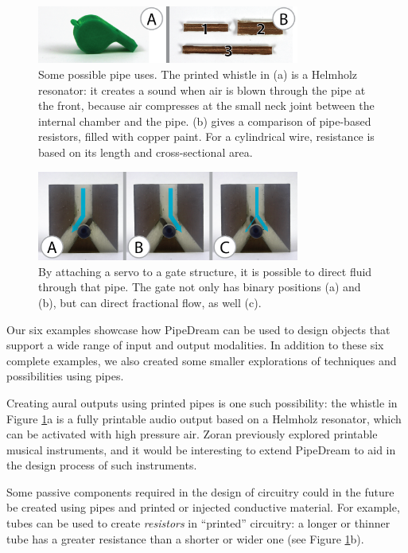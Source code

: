 \begin{figure}
\centering
    \includegraphics[width=3.4in]{figures/speculative.png}
\caption{Some possible pipe uses.  The printed whistle in (a) is a Helmholz resonator: it creates a sound when air is blown through the pipe at the front, because air compresses at the small neck joint between the internal chamber and the pipe.  (b) gives a comparison of pipe-based resistors, filled with copper paint.  For a cylindrical wire, resistance is based on its length and cross-sectional area.}
\label{fig:speculative}
\end{figure}

\begin{figure}
\centering
    \includegraphics[width=3.4in]{figures/gates.png}
\caption{By attaching a servo to a gate structure, it is possible to direct fluid through that pipe.  The gate not only has binary positions (a) and (b), but can direct fractional flow, as well (c).}
\label{fig:direct}
\end{figure}

Our six examples showcase how PipeDream can be used to design objects that support a wide range of input and output modalities.  In addition to these six complete examples, we also created some smaller explorations of techniques and possibilities using pipes.

Creating aural outputs using printed pipes is one such possibility: the whistle in Figure \ref{fig:speculative}a is a fully printable audio output based on a Helmholz resonator, which can be activated with high pressure air.  Zoran \cite{Zoran-flute} previously explored printable musical instruments, and it would be interesting to extend PipeDream to aid in the design process of such instruments.

Some passive components required in the design of circuitry could in the future be created using pipes and printed or injected conductive material.  For example, tubes can be used to create \emph{resistors} in ``printed'' circuitry: a longer or thinner tube has a greater resistance than a shorter or wider one (see Figure \ref{fig:speculative}b).

